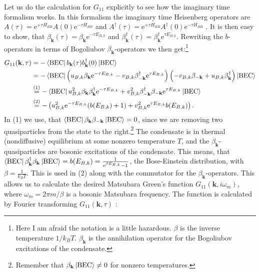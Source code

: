 Let us do the calculation for $G_{11}$ explicitly to see how the imaginary time formalism works. In this formalism the imaginary time Heisenberg operators are $A(\tau) = \text{e}^{+\tau H_{BB}}A(0)\text{e}^{-\tau H_{BB}}$ and $A^\dagger(\tau) = \text{e}^{+\tau H_{BB}}A^\dagger(0)\text{e}^{-\tau H_{BB}}$ \cite[p. 185]{BruusFlensberg}. It is then easy to show, that $\beta_\mathbf{k}(\tau) = \beta_\mathbf{k}\text{e}^{-\tau E_{B,k}}$ and $\beta^\dagger_\mathbf{k}(\tau) = \beta^\dagger_\mathbf{k}\text{e}^{\tau E_{B,k}}$. Rewriting the $b$-operators in terms of Bogoliubov $\beta_\mathbf{k}$-operators we then get:\footnote{Here I am afraid the notation is a little hazardous. $\beta$ is the inverse temperature $1/k_BT$. $\beta_\mathbf{k}$ is the annihilation operator for the Bogoliubov excitations of the condensate.}
\begin{align}
G_{11}(\mathbf{k},\tau) &= -\bra{\text{BEC}} b_\mathbf{k}(\tau)b_\mathbf{k}^\dagger(0)\ket{\text{BEC}} \nonumber \\
&= -\bra{\text{BEC}} \left(u_{B,k}\beta_\mathbf{k}\text{e}^{-\tau E_{B,k}} - v_{B,k} \beta^\dagger_{-\mathbf{k}}\text{e}^{\tau E_{B,k}} \right)\left( -v_{B,k}\beta_{-\mathbf{k}} + u_{B,k} \beta^\dagger_{\mathbf{k}} \right)\ket{\text{BEC}} \nonumber \\
&\overset{(1)}{=} -\bra{\text{BEC}} u_{B,k}^2\beta_\mathbf{k}\beta^\dagger_\mathbf{k}\text{e}^{-\tau E_{B,k}} + v_{B,k}^2 \beta^\dagger_{-\mathbf{k}}\beta_{-\mathbf{k}}\text{e}^{\tau E_{B,k}} \ket{\text{BEC}} \nonumber \\
&\overset{(2)}{=} -\left(u_{B,k}^2 \text{e}^{-\tau E_{B,k}}(b(E_{B,k})+1)+ v_{B,k}^2\text{e}^{\tau E_{B,k}}b(E_{B,k})\right). \nonumber
\end{align}
In (1) we use, that $\bra{\text{BEC}}\beta_\mathbf{k}\beta_{-\mathbf{k}}\ket{\text{BEC}} = 0$, since we are removing two quasiparticles from the state to the right.\footnote{Remember that $\beta_\mathbf{k}\ket{\text{BEC}} \neq 0$ for nonzero temperatures.} The condensate is in thermal (nondiffusive) equilibrium at some nonzero temperature $T$, and the $\beta_\mathbf{k}$-quasiparticles are bosonic excitations of the condensate. This means, that $\bra{\text{BEC}}\beta_\mathbf{k}^\dagger\beta_{\mathbf{k}}\ket{\text{BEC}} = b(E_{B,k}) = \frac{1}{\text{e}^{\beta E_{B,k}}-1}$, the Bose-Einstein distribution, with $\beta = \frac{1}{k_BT}$. This is used in (2) along with the commutator for the $\beta_\mathbf{k}$-operators. This allows us to calculate the desired Matsubara Green's function $G_{11}(\mathbf{k},i\omega_m)$, where $\omega_m = 2\pi m/\beta$ is a bosonic Matsubara frequency. The function is calculated by Fourier transforming $G_{11}(\mathbf{k},\tau)$ \cite[p. 187-189]{BruusFlensberg}: 
